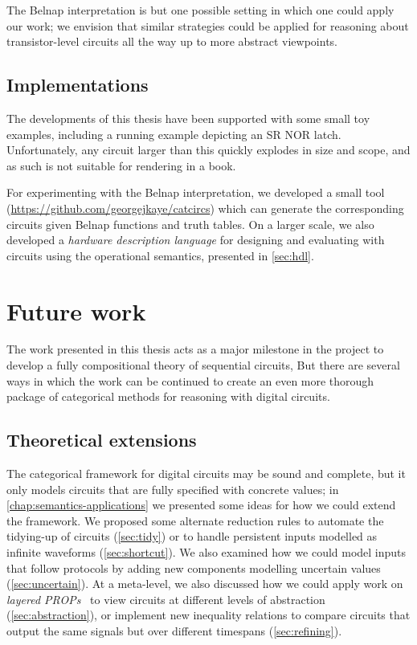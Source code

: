 The Belnap interpretation is but one possible setting in which one could apply
our work; we envision that similar strategies could be applied for reasoning
about transistor-level circuits all the way up to more abstract viewpoints.

\subsection{Implementations}

The developments of this thesis have been supported with some small toy
examples, including a running example depicting an SR NOR latch.
Unfortunately, any circuit larger than this quickly explodes in size and scope,
and as such is not suitable for rendering in a book.

For experimenting with the Belnap interpretation, we developed a small tool
(\url{https://github.com/georgejkaye/catcircs}) which can generate the
corresponding circuits given Belnap functions and truth tables.
On a larger scale, we also developed a \emph{hardware description language} for
designing and evaluating with circuits using the operational semantics,
presented in \cref{sec:hdl}.

\section{Future work}

The work presented in this thesis acts as a major milestone in the project to
develop a fully compositional theory of sequential circuits,
But there are several ways in which the work can be continued to create an
even more thorough package of categorical methods for reasoning with digital
circuits.

\subsection{Theoretical extensions}

The categorical framework for digital circuits may be sound and complete, but
it only models circuits that are fully specified with concrete values; in
\cref{chap:semantics-applications} we presented some ideas for how we could
extend the framework.
We proposed some alternate reduction rules to automate the tidying-up of
circuits (\cref{sec:tidy}) or to handle persistent inputs modelled as infinite
waveforms (\cref{sec:shortcut}).
We also examined how we could model inputs that follow protocols by adding new
components modelling uncertain values (\cref{sec:uncertain}).
At a meta-level, we also discussed how we could apply work on
\emph{layered PROPs}~\cite{lobski2022string} to view circuits at different
levels of abstraction (\cref{sec:abstraction}), or implement new inequality
relations to compare circuits that output the same signals but over different
timespans (\cref{sec:refining}).

